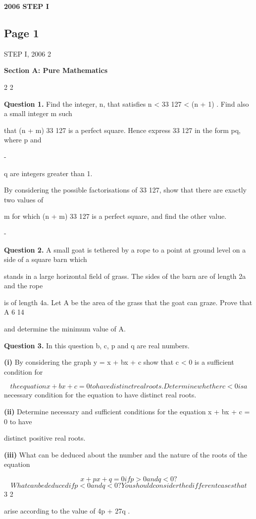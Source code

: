 \documentclass[12pt]{article}
\begin{document}
\begin{center}
{\Large \textbf{2006 STEP I}}
\end{center}

\subsection*{Page 1}
\begin{flushleft}
STEP I, 2006 2\par
\bigskip\textbf{Section A: Pure Mathematics}\par
2 2\par
\bigskip\textbf{Question 1.} Find the integer, n, that satisfies n < 33 127 < (n + 1) . Find also a small integer m such\par
that (n + m) 33 127 is a perfect square. Hence express 33 127 in the form pq, where p and\par
-\par
q are integers greater than 1.\par
By considering the possible factorisations of 33 127, show that there are exactly two values of\par
m for which (n + m) 33 127 is a perfect square, and find the other value.\par
-\par
\bigskip\textbf{Question 2.} A small goat is tethered by a rope to a point at ground level on a side of a square barn which\par
stands in a large horizontal field of grass. The sides of the barn are of length 2a and the rope\par
is of length 4a. Let A be the area of the grass that the goat can graze. Prove that A 6 14\par
and determine the minimum value of A.\par
\bigskip\textbf{Question 3.} In this question b, c, p and q are real numbers.\par
\textbf{(i)} By considering the graph y = x + bx + c show that c < 0 is a sufficient condition for\par
\[the equation x + bx + c = 0 to have distinct real roots. Determine whether c < 0 is a\]
necessary condition for the equation to have distinct real roots.\par
\textbf{(ii)} Determine necessary and sufficient conditions for the equation x + bx + c = 0 to have\par
distinct positive real roots.\par
\textbf{(iii)} What can be deduced about the number and the nature of the roots of the equation\par
\[x + px + q = 0 if p > 0 and q < 0?\]
\[What can be deduced if p < 0 and q < 0? You should consider the different cases that\]
3 2\par
arise according to the value of 4p + 27q .\par
\end{flushleft}
\end{document}
